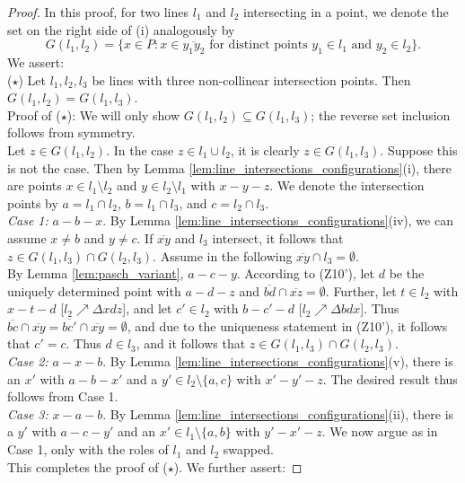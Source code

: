 \documentclass[11pt,a4paper]{article}
\newcommand{\betw}[3]{#1 - #2 - #3}
\newcommand{\lineab}[1]{\overline{#1}}
\begin{document}
\begin{proof}
In this proof, for two lines $l_1$ and $l_2$ intersecting in a point, we denote the set on the right side of (i) analogously by
\[ G(l_1, l_2) = \{x \in P : x \in \lineab{y_1 y_2} \text{ for distinct points } y_1 \in l_1 \text{ and } y_2 \in l_2\}. \]
We assert: \\
($\star$) Let $l_1, l_2, l_3$ be lines with three non-collinear intersection points. Then $G(l_1, l_2) = G(l_1, l_3)$. \\
Proof of ($\star$): We will only show $G(l_1, l_2) \subseteq G(l_1, l_3)$; the reverse set inclusion follows from symmetry. \\
Let $z \in G(l_1, l_2)$. In the case $z \in l_1 \cup l_2$, it is clearly $z \in G(l_1, l_3)$. Suppose this is not the case. Then by Lemma \ref{lem:line_intersections_configurations}(i), there are points $x \in l_1 \setminus l_2$ and $y \in l_2 \setminus l_1$ with $\betw{x}{y}{z}$. We denote the intersection points by $a = l_1 \cap l_2$, $b = l_1 \cap l_3$, and $c = l_2 \cap l_3$. \\
\textit{Case 1:} $\betw{a}{b}{x}$. By Lemma \ref{lem:line_intersections_configurations}(iv), we can assume $x \neq b$ and $y \neq c$. If $\lineab{xy}$ and $l_3$ intersect, it follows that $z \in G(l_1, l_3) \cap G(l_2, l_3)$. Assume in the following $\lineab{xy} \cap l_3 = \emptyset$. \\
By Lemma \ref{lem:pasch_variant}, $\betw{a}{c}{y}$. According to (Z10'), let $d$ be the uniquely determined point with $\betw{a}{d}{z}$ and $\lineab{bd} \cap \lineab{xz} = \emptyset$. Further, let $t \in l_2$ with $\betw{x}{t}{d}$ [$l_2 \nearrow \Delta x d z$], and let $c' \in l_2$ with $\betw{b}{c'}{d}$ [$l_2 \nearrow \Delta b d x$]. Thus $\lineab{bc} \cap \lineab{xy} = \lineab{bc'} \cap \lineab{xy} = \emptyset$, and due to the uniqueness statement in (Z10'), it follows that $c' = c$. Thus $d \in l_3$, and it follows that $z \in G(l_1, l_3) \cap G(l_2, l_3)$. \\
\textit{Case 2:} $\betw{a}{x}{b}$. By Lemma \ref{lem:line_intersections_configurations}(v), there is an $x'$ with $\betw{a}{b}{x'}$ and a $y' \in l_2 \setminus \{a, c\}$ with $\betw{x'}{y'}{z}$. The desired result thus follows from Case 1. \\
\textit{Case 3:} $\betw{x}{a}{b}$. By Lemma \ref{lem:line_intersections_configurations}(ii), there is a $y'$ with $\betw{a}{c}{y'}$ and an $x' \in l_1 \setminus \{a, b\}$ with $\betw{y'}{x'}{z}$. We now argue as in Case 1, only with the roles of $l_1$ and $l_2$ swapped. \\
This completes the proof of ($\star$). We further assert:


\end{proof}
\end{document}
